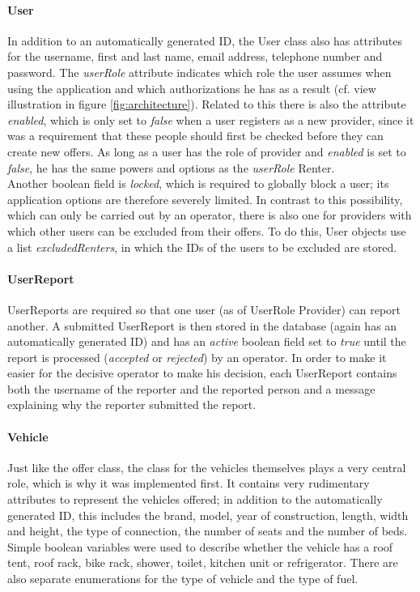 \paragraph{User}
In addition to an automatically generated ID, the User class also has attributes for the username, first and last name, email address, telephone number and password. The \textit{userRole} attribute indicates which role the user assumes when using the application and which authorizations he has as a result (cf. view illustration in figure \ref{fig:architecture}). Related to this there is also the attribute \textit{enabled}, which is only set to \textit{false} when a user registers as a new provider, since it was a requirement that these people should first be checked before they can create new offers. As long as a user has the role of provider and \textit{enabled} is set to \textit{false}, he has the same powers and options as the \textit{userRole} Renter. \\
Another boolean field is \textit{locked}, which is required to globally block a user; its application options are therefore severely limited. In contrast to this possibility, which can only be carried out by an operator, there is also one for providers with which other users can be excluded from their offers. To do this, User objects use a list \textit{excludedRenters}, in which the IDs of the users to be excluded are stored.

\paragraph{UserReport}
UserReports are required so that one user (as of UserRole Provider) can report another. A submitted UserReport is then stored in the database (again has an automatically generated ID) and has an \textit{active} boolean field set to \textit{true} until the report is processed (\textit{accepted} or \textit{rejected}) by an operator. In order to make it easier for the decisive operator to make his decision, each UserReport contains both the username of the reporter and the reported person and a message explaining why the reporter submitted the report.

\paragraph{Vehicle}
Just like the offer class, the class for the vehicles themselves plays a very central role, which is why it was implemented first. It contains very rudimentary attributes to represent the vehicles offered; in addition to the automatically generated ID, this includes the brand, model, year of construction, length, width and height, the type of connection, the number of seats and the number of beds. Simple boolean variables were used to describe whether the vehicle has a roof tent, roof rack, bike rack, shower, toilet, kitchen unit or refrigerator. There are also separate enumerations for the type of vehicle and the type of fuel.

